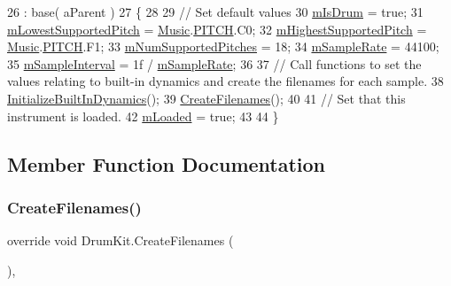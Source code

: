 \begin{DoxyCode}
26                                                        : base( aParent )
27     \{
28 
29         \textcolor{comment}{// Set default values}
30         \hyperlink{group___v_i_base_pro_var_ga47dbd8aa02ab32b8f802adfd2d3d81de}{mIsDrum} = \textcolor{keyword}{true};
31         \hyperlink{group___v_i_base_pro_var_ga3cae52b1bcc0178a8a6b03c7aaf7aac8}{mLowestSupportedPitch} = \hyperlink{class_music}{Music}.\hyperlink{group___music_enums_ga508f69b199ea518f935486c990edac1d}{PITCH}.C0;
32         \hyperlink{group___v_i_base_pro_var_ga61fb2c33b53a0f663047779d7ceb18f3}{mHighestSupportedPitch} = \hyperlink{class_music}{Music}.\hyperlink{group___music_enums_ga508f69b199ea518f935486c990edac1d}{PITCH}.F1;
33         \hyperlink{group___v_i_base_pro_var_gafc759a16324cf9b3f230bcbf040afcd2}{mNumSupportedPitches} = 18;
34         \hyperlink{group___v_i_base_pro_var_ga80b3d2ff29b27698eea6bcf2f8ddc5d7}{mSampleRate} = 44100;
35         \hyperlink{group___v_i_base_pro_var_ga20c1d3d25ea666378d72c833d160ae2e}{mSampleInterval} = 1f / \hyperlink{group___v_i_base_pro_var_ga80b3d2ff29b27698eea6bcf2f8ddc5d7}{mSampleRate};
36 
37         \textcolor{comment}{// Call functions to set the values relating to built-in dynamics and create the filenames for each
       sample.}
38         \hyperlink{class_drum_kit_ad14c6155e6ec62f26a30261e273d6379}{InitializeBuiltInDynamics}();
39         \hyperlink{class_drum_kit_a25bb92cf56bc1b3434465faf73cd09cf}{CreateFilenames}();
40 
41         \textcolor{comment}{// Set that this instrument is loaded.}
42         \hyperlink{group___v_i_base_pro_var_ga8978807d1878db5aae91fbd057c46097}{mLoaded} = \textcolor{keyword}{true};
43 
44     \}
\end{DoxyCode}


\subsection{Member Function Documentation}
\mbox{\label{class_drum_kit_a25bb92cf56bc1b3434465faf73cd09cf}} 
\subsubsection{\texorpdfstring{Create\+Filenames()}{CreateFilenames()}}
{\footnotesize\ttfamily override void Drum\+Kit.\+Create\+Filenames (\begin{DoxyParamCaption}{ }\end{DoxyParamCaption})\hspace{0.3cm}{\ttfamily [protected]}, {\ttfamily [virtual]}}



